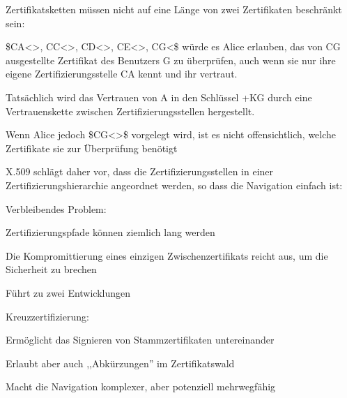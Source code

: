 \documentclass[a4paper]{article}
\begin{document}
\begin{multicols}{3}
\begin{itemize*}
\begin{itemize*}
            \end{itemize*}
            \item Zertifikatsketten müssen nicht auf eine Länge von zwei Zertifikaten
            beschränkt sein:
            \begin{itemize*}
                  \item \$CA\textless{}\textgreater, CC\textless{}\textgreater, CD\textless{}\textgreater, CE\textless{}\textgreater, CG\textless{}\$ würde es Alice erlauben, das von CG ausgestellte Zertifikat des Benutzers G zu überprüfen, auch wenn sie nur ihre eigene Zertifizierungsstelle CA kennt und ihr vertraut.
                  \item Tatsächlich wird das Vertrauen von A in den Schlüssel +KG durch eine Vertrauenskette zwischen Zertifizierungsstellen hergestellt.
                  \item Wenn Alice jedoch \$CG\textless{}\textgreater\$ vorgelegt wird, ist es nicht offensichtlich, welche Zertifikate sie zur Überprüfung benötigt
            \end{itemize*}
            \item X.509 schlägt daher vor, dass die Zertifizierungsstellen in einer
            Zertifizierungshierarchie angeordnet werden, so dass die Navigation
            einfach ist:
            \item Verbleibendes Problem:
            \begin{itemize*}
                  \item Zertifizierungspfade können ziemlich lang werden
                  \item Die Kompromittierung eines einzigen Zwischenzertifikats reicht aus, um die Sicherheit zu brechen
            \end{itemize*}
            \item Führt zu zwei Entwicklungen
            \begin{itemize*}
                  \item Kreuzzertifizierung:
                  \begin{itemize*} \item Ermöglicht das Signieren von Stammzertifikaten untereinander \item Erlaubt aber auch ,,Abkürzungen'' im Zertifikatswald \item Macht die Navigation komplexer, aber potenziell mehrwegfähig \end{itemize*}

\end{itemize*}
\end{itemize*}
\end{multicols}
\end{document}
